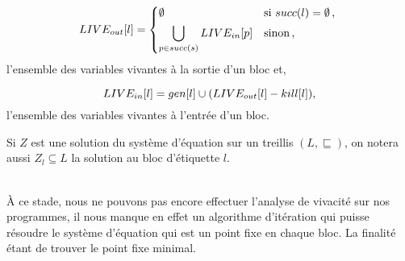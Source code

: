 \documentclass[a4paper, 10pt]{article}
\begin{document}
\[
	LIVE_{out}[l] = 
	\begin{dcases*}
		\emptyset &si $succ(l) = \emptyset $\,, \\
		\bigcup\limits_{p\in succ(s)} LIVE_{in}[p] &sinon\,,
	\end{dcases*}
\]
l'ensemble des variables vivantes à la sortie d'un bloc et,

\[
	LIVE_{in}[l] = gen[l] \cup (LIVE_{out}[l] - kill[l]),
\]
l'ensemble des variables vivantes à l'entrée d'un bloc.
\\
\begin{notation}
	Si $Z$ est une solution du système d'équation sur un treillis $(L, \sqsubseteq)$, on notera aussi $Z_l \subseteq L$
	la solution au bloc d'étiquette $l$.
\end{notation}
\\
À ce stade, nous ne pouvons pas encore effectuer l'analyse de vivacité sur nos programmes, il nous manque en
effet un algorithme d'itération qui puisse résoudre le système d'équation qui est un point fixe en chaque bloc.
La finalité étant de trouver le point fixe minimal.
\end{document}
